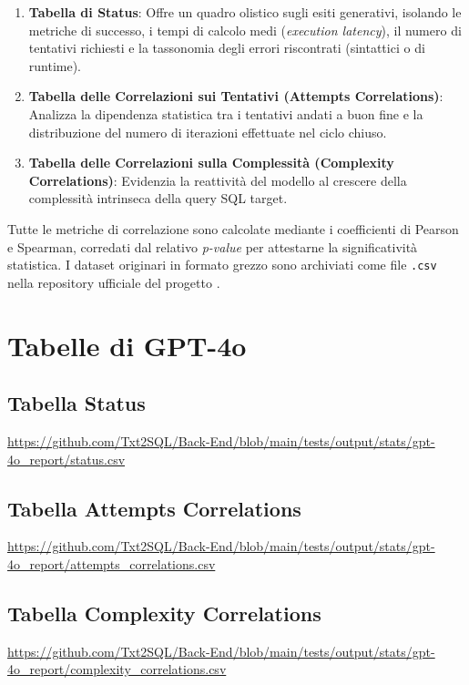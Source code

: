 \begin{enumerate}
    \item \textbf{Tabella di Status}: Offre un quadro olistico sugli esiti generativi, isolando le metriche di successo, i tempi di calcolo medi (\textit{execution latency}), il numero di tentativi richiesti e la tassonomia degli errori riscontrati (sintattici o di runtime).
    \item \textbf{Tabella delle Correlazioni sui Tentativi (Attempts Correlations)}: Analizza la dipendenza statistica tra i tentativi andati a buon fine e la distribuzione del numero di iterazioni effettuate nel ciclo chiuso.
    \item \textbf{Tabella delle Correlazioni sulla Complessità (Complexity Correlations)}: Evidenzia la reattività del modello al crescere della complessità intrinseca della query SQL target.
\end{enumerate}

Tutte le metriche di correlazione sono calcolate mediante i coefficienti di Pearson e Spearman, corredati dal relativo \textit{p-value} per attestarne la significatività statistica. I dataset originari in formato grezzo sono archiviati come file \texttt{.csv} nella repository ufficiale del progetto \cite{github_project}.

\newcommand{\csvfittable}[1]{%
    \begin{adjustbox}{max width=\textwidth,max totalheight=0.62\textheight,center}
        \csvautotabular{#1}
    \end{adjustbox}%
}

\section{Tabelle di GPT-4o}

\subsection{Tabella Status}
\label{tab:status_gpt4o}
\url{https://github.com/Txt2SQL/Back-End/blob/main/tests/output/stats/gpt-4o_report/status.csv}

\subsection{Tabella Attempts Correlations}
\label{tab:attempts_gpt4o}
\url{https://github.com/Txt2SQL/Back-End/blob/main/tests/output/stats/gpt-4o_report/attempts_correlations.csv}

\subsection{Tabella Complexity Correlations}
\label{tab:complexity_gpt4o}
\url{https://github.com/Txt2SQL/Back-End/blob/main/tests/output/stats/gpt-4o_report/complexity_correlations.csv}


